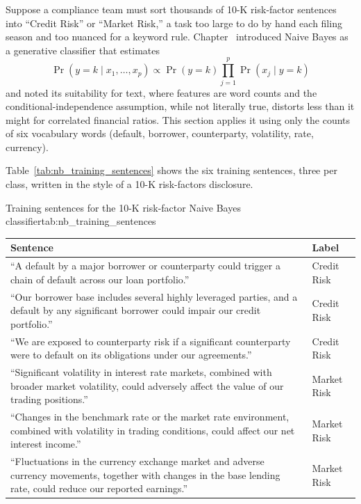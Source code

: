 \documentclass[../ai_in_finance]{subfiles}
\begin{document}
Suppose a compliance team must sort thousands of 10-K risk-factor sentences into ``Credit Risk'' or ``Market Risk,'' a task too large to do by hand each filing season and too nuanced for a keyword rule. Chapter~ introduced Naive Bayes as a generative classifier that estimates
\begin{equation}
\Pr(y=k \mid x_1,\ldots,x_p) \propto \Pr(y=k)\prod_{j=1}^p \Pr(x_j \mid y=k)
\label{eq:nlp-naive-bayes}
\end{equation}
and noted its suitability for text, where features are word counts and the conditional-independence assumption, while not literally true, distorts less than it might for correlated financial ratios. This section applies it using only the counts of six vocabulary words (default, borrower, counterparty, volatility, rate, currency).

Table~\ref{tab:nb_training_sentences} shows the six training sentences, three per class, written in the style of a 10-K risk-factors disclosure.

\begin{booktable}[htbp]{Training sentences for the 10-K risk-factor Naive Bayes classifier}{tab:nb_training_sentences}
\begin{tabular}{L{10cm}l}
\toprule
Sentence & Label \\
\midrule
``A default by a major borrower or counterparty could trigger a chain of default across our loan portfolio.'' & Credit Risk \\
``Our borrower base includes several highly leveraged parties, and a default by any significant borrower could impair our credit portfolio.'' & Credit Risk \\
``We are exposed to counterparty risk if a significant counterparty were to default on its obligations under our agreements.'' & Credit Risk \\
``Significant volatility in interest rate markets, combined with broader market volatility, could adversely affect the value of our trading positions.'' & Market Risk \\
``Changes in the benchmark rate or the market rate environment, combined with volatility in trading conditions, could affect our net interest income.'' & Market Risk \\
``Fluctuations in the currency exchange market and adverse currency movements, together with changes in the base lending rate, could reduce our reported earnings.'' & Market Risk \\
\bottomrule
\end{tabular}
\end{booktable}
\end{document}
